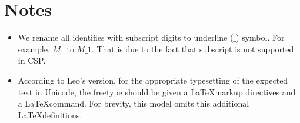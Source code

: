 \documentclass{report} %
\begin{document}
\section{Notes}
\begin{itemize}
    \item We rename all identifies with subscript digits to underline ($\_$) symbol. For example, $M_1$ to $M\_1$. That is due to the fact that subscript is not supported in CSP.
    \item According to Leo's version, for the appropriate typesetting of the expected text in Unicode, the freetype should be given a \LaTeX markup directives and a \LaTeX command. For brevity, this model omits this additional \LaTeX definitions. 
\end{itemize}
%
%
%
%
%
%
%
%
\end{document}
